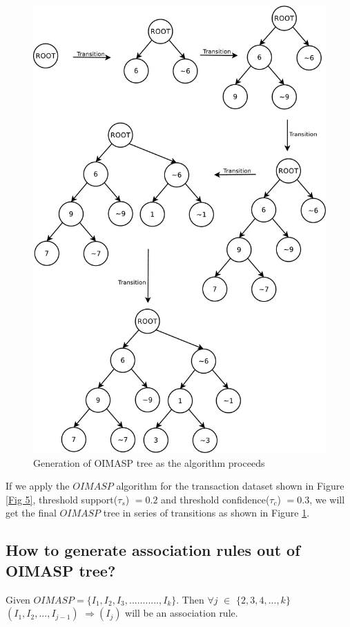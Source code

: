 \documentclass[review]{elsarticle}
\begin{document}
\begin{figure}
\begin{center}
\includegraphics[scale=0.3]{pdf/transition}
\end{center}
\caption{Generation of OIMASP tree as the algorithm proceeds}
\label{Fig 6}
\end{figure}

If we apply the $ OIMASP $ algorithm for the transaction dataset shown in Figure \ref{Fig 5}, threshold support($ \tau _{s} $) $ = 0.2 $ and threshold confidence($ \tau _{c} $) $ = 0.3 $, we will get the final $ OIMASP $ tree in series of transitions as shown in Figure \ref{Fig 6}.

\subsection{How to generate association rules out of OIMASP tree?}
\begin{rmk}
	Given $ OIMASP = \{I_{1}, I_{2}, I_{3}, ..........., I_{k}\} $. Then $ \forall j $ $ \in $ $ \lbrace 2, 3, 4, 		..., k \rbrace $ $ (I_{1}, I_{2}, ..., I_{j-1})$ $ \Rightarrow (I_{j}) $ will be an association rule.		
\end{rmk}
\end{document}
